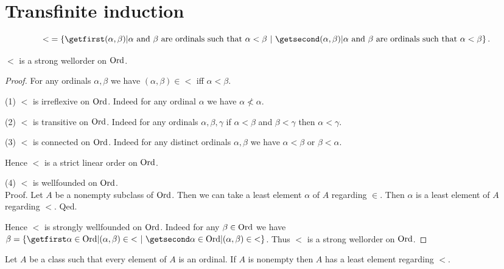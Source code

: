 \documentclass[../set-theory.tex]{subfiles}
\begin{document}
  \section{Transfinite induction}

  \begin{forthel}
    \begin{definition}\label{SET_THEORY_15_4059354166722560}
      \[ {<} = \class{(\alpha, \beta) | \text{$\alpha$ and $\beta$ are ordinals
      such that $\alpha < \beta$}}. \]
    \end{definition}
  \end{forthel}

  \begin{forthel}
    \begin{proposition}\label{SET_THEORY_15_4859038791630848}
      ${<}$ is a strong wellorder on $\mathrm{Ord}$.
    \end{proposition}
    \begin{proof}
      For any ordinals $\alpha, \beta$ we have $(\alpha,\beta) \in {<}$ iff
      $\alpha < \beta$.

      (1) ${<}$ is irreflexive on $\mathrm{Ord}$.
      Indeed for any ordinal $\alpha$ we have $\alpha \nless \alpha$.

      (2) ${<}$ is transitive on $\mathrm{Ord}$.
      Indeed for any ordinals $\alpha, \beta, \gamma$ if $\alpha < \beta$ and
      $\beta < \gamma$ then $\alpha < \gamma$.

      (3) ${<}$ is connected on $\mathrm{Ord}$.
      Indeed for any distinct ordinals $\alpha, \beta$ we have $\alpha < \beta$
      or $\beta < \alpha$.

      Hence ${<}$ is a strict linear order on $\mathrm{Ord}$.

      (4) ${<}$ is wellfounded on $\mathrm{Ord}$. \\
      Proof.
        Let $A$ be a nonempty subclass of $\mathrm{Ord}$.
        Then we can take a least element $\alpha$ of $A$ regarding ${\in}$.
        Then $\alpha$ is a least element of $A$ regarding ${<}$.
      Qed.

      Hence ${<}$ is strongly wellfounded on $\mathrm{Ord}$.
      Indeed for any $\beta \in \mathrm{Ord}$ we have $\beta = \class{\alpha \in \Ord |
      (\alpha,\beta) \in {<}}$.
      Thus ${<}$ is a strong wellorder on $\mathrm{Ord}$.
    \end{proof}
  \end{forthel}

  \begin{forthel}
    \begin{corollary}\label{SET_THEORY_15_1042046129274880}
      Let $A$ be a class such that every element of $A$ is an ordinal.
      If $A$ is nonempty then $A$ has a least element regarding ${<}$.
    \end{corollary}
  \end{forthel}
\end{document}

